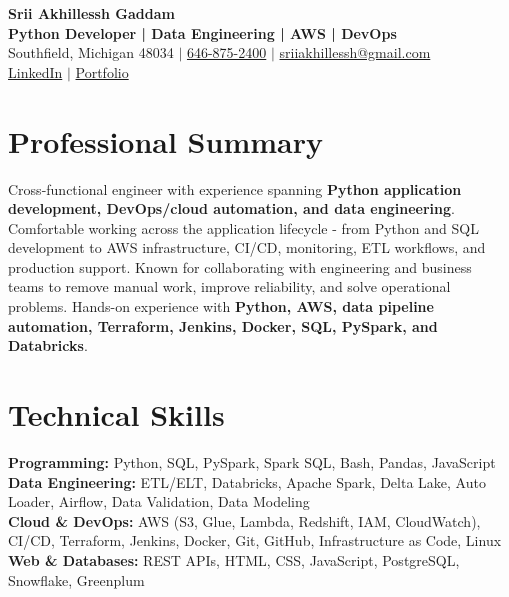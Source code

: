 \documentclass[letterpaper,10pt]{article}
\begin{document}
\fontsize{9.35pt}{10.45pt}\selectfont

\begin{center}
    {\LARGE \textbf{Srii Akhillessh Gaddam}} \\[-1pt]
    \textbf{Python Developer | Data Engineering | AWS | DevOps} \\[2pt]
    Southfield, Michigan 48034 $|$
    \href{tel:6468752400}{646-875-2400} $|$
    \href{mailto:sriiakhillessh@gmail.com}{sriiakhillessh@gmail.com} \\[1pt]
    \href{https://www.linkedin.com/in/srii-akhiilessh-gaddam-b48668191/}{LinkedIn} $|$
    \href{https://sriiakhillesshg.github.io/portfolio/}{Portfolio}
\end{center}
\vspace{-8pt}

\section{Professional Summary}
\small{Cross-functional engineer with experience spanning \textbf{Python application development, DevOps/cloud automation, and data engineering}. Comfortable working across the application lifecycle - from Python and SQL development to AWS infrastructure, CI/CD, monitoring, ETL workflows, and production support. Known for collaborating with engineering and business teams to remove manual work, improve reliability, and solve operational problems. Hands-on experience with \textbf{Python, AWS, data pipeline automation, Terraform, Jenkins, Docker, SQL, PySpark, and Databricks}.}

\section{Technical Skills}
\small{
\textbf{Programming:} Python, SQL, PySpark, Spark SQL, Bash, Pandas, JavaScript \\
\textbf{Data Engineering:} ETL/ELT, Databricks, Apache Spark, Delta Lake, Auto Loader, Airflow, Data Validation, Data Modeling \\
\textbf{Cloud \& DevOps:} AWS (S3, Glue, Lambda, Redshift, IAM, CloudWatch), CI/CD, Terraform, Jenkins, Docker, Git, GitHub, Infrastructure as Code, Linux \\
\textbf{Web \& Databases:} REST APIs, HTML, CSS, JavaScript, PostgreSQL, Snowflake, Greenplum
}
\end{document}
